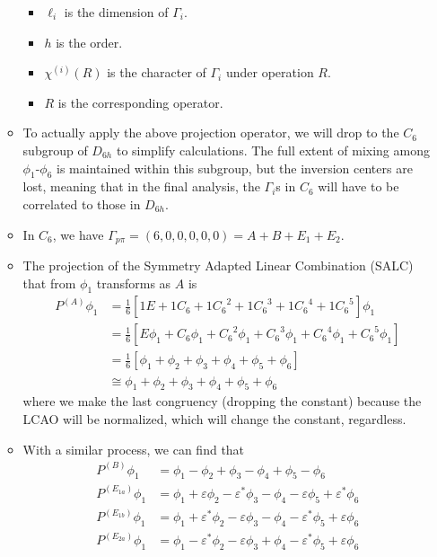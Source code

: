 \documentclass[../notes.tex]{subfiles}
\begin{document}
\begin{itemize}
\begin{itemize}
\begin{itemize}
            \item $\ell_i$ is the dimension of $\Gamma_i$.
            \item $h$ is the order.
            \item $\chi^{(i)}(R)$ is the character of $\Gamma_i$ under operation $R$.
            \item $R$ is the corresponding operator.
        \end{itemize}
        \item To actually apply the above projection operator, we will drop to the $C_6$ subgroup of $D_{6h}$ to simplify calculations. The full extent of mixing among $\phi_1$-$\phi_6$ is maintained within this subgroup, but the inversion centers are lost, meaning that in the final analysis, the $\Gamma_i$s in $C_6$ will have to be correlated to those in $D_{6h}$.
        \item In $C_6$, we have $\Gamma_{p\pi}=(6,0,0,0,0,0)=A+B+E_1+E_2$.
        \item The projection of the Symmetry Adapted Linear Combination (SALC) that from $\phi_1$ transforms as $A$ is
        \begin{align*}
            P^{(A)}\phi_1 &= \frac{1}{6}[1E+1C_6+1{C_6}^2+1{C_6}^3+1{C_6}^4+1{C_6}^5]\phi_1\\
            &= \frac{1}{6}[E\phi_1+C_6\phi_1+{C_6}^2\phi_1+{C_6}^3\phi_1+{C_6}^4\phi_1+{C_6}^5\phi_1]\\
            &= \frac{1}{6}[\phi_1+\phi_2+\phi_3+\phi_4+\phi_5+\phi_6]\\
            &\cong \phi_1+\phi_2+\phi_3+\phi_4+\phi_5+\phi_6
        \end{align*}
        where we make the last congruency (dropping the constant) because the LCAO will be normalized, which will change the constant, regardless.
        \item With a similar process, we can find that
        \begin{align*}
            P^{(B)}\phi_1      &= \phi_1-\phi_2             +\phi_3             -\phi_4+\phi_5             -\phi_6\\
            P^{(E_{1a})}\phi_1 &= \phi_1+\varepsilon\phi_2  -\varepsilon^*\phi_3-\phi_4-\varepsilon\phi_5  +\varepsilon^*\phi_6\\
            P^{(E_{1b})}\phi_1 &= \phi_1+\varepsilon^*\phi_2-\varepsilon\phi_3  -\phi_4-\varepsilon^*\phi_5+\varepsilon\phi_6\\
            P^{(E_{2a})}\phi_1 &= \phi_1-\varepsilon^*\phi_2-\varepsilon\phi_3  +\phi_4-\varepsilon^*\phi_5+\varepsilon\phi_6\\

\end{align*}
\end{itemize}
\end{itemize}
\end{document}
